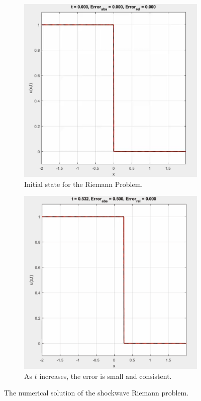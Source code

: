 \documentclass{myproject}
\begin{document}
\begin{figure}
\centering
    \begin{subfigure}{.48\textwidth}
        \centering
        \includegraphics[width=1.0\textwidth]{t0_shockwave.png}
        \caption{Initial state for the Riemann Problem.}
    \end{subfigure}\hfill
    \begin{subfigure}{.48\textwidth}
        \centering
        \includegraphics[width=1\textwidth]{t05_shockwave.png}
        \caption{As $t$ increases, the error is small and consistent.}
    \end{subfigure}
    \caption{The numerical solution of the shockwave Riemann problem.}
\end{figure}
\end{document}
